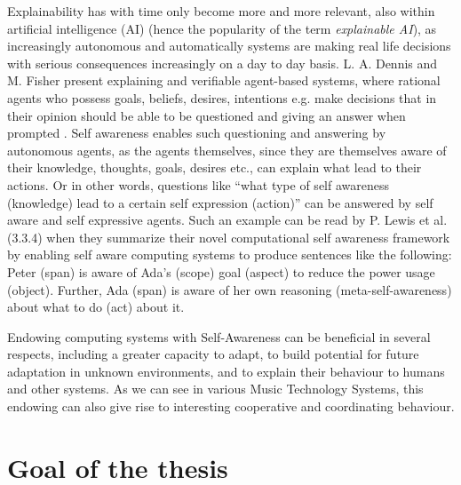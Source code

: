 Explainability has with time only become more and more relevant, also within artificial intelligence (AI) (hence the popularity of the term \textit{explainable AI}), as increasingly autonomous and automatically systems are making real life decisions with serious consequences increasingly on a day to day basis. L. A. Dennis and M. Fisher present explaining and verifiable agent-based systems, where rational agents who possess goals, beliefs, desires, intentions e.g. make decisions that in their opinion should be able to be questioned and giving an answer when prompted \cite{verifiable_and_questionable_agents}. Self awareness enables such questioning and answering by autonomous agents, as the agents themselves, since they are themselves aware of their knowledge, thoughts, goals, desires etc., can explain what lead to their actions. Or in other words, questions like ``what type of self awareness \cite{sacs16_ch2} (knowledge) lead to a certain self expression \cite{sacs16_ch2} (action)'' can be answered by self aware and self expressive agents. Such an example can be read by P. Lewis et al. \cite{sacs17_ch3} (3.3.4) when they summarize their novel computational self awareness framework by enabling self aware computing systems to produce sentences like the following: Peter (span) is aware of Ada's (scope) goal (aspect) to reduce the power usage (object). Further, Ada (span) is aware of her own reasoning (meta-self-awareness) about what to do (act) about it.

Endowing computing systems with Self-Awareness can be beneficial in several respects, including a greater capacity to adapt, to build potential for future adaptation in unknown environments, and to explain their behaviour to humans and other systems. As we can see in various Music Technology Systems, this endowing can also give rise to interesting cooperative and coordinating behaviour.




\section{Goal of the thesis} %

